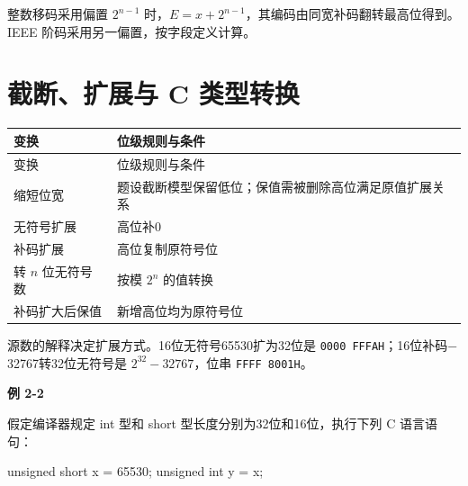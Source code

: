 整数移码采用偏置 \(2^{n-1}\) 时，\(E=x+2^{n-1}\)，其编码由同宽补码翻转最高位得到。IEEE 阶码采用另一偏置，按字段定义计算。

\section{截断、扩展与 C 类型转换}\label{CO02-conversion}

\par\smallskip
{\fontsize{9.3}{12}\selectfont\setlength{\tabcolsep}{2.5pt}\setlength{\LTleft}{0pt}\setlength{\LTright}{0pt}
\begin{longtable}{@{}>{\raggedright\arraybackslash}p{}>{\raggedright\arraybackslash}p{}@{}}
\toprule
变换 & 位级规则与条件 \\

\midrule\endfirsthead\toprule
变换 & 位级规则与条件 \\

\midrule\endhead\bottomrule\endfoot
缩短位宽 & 题设截断模型保留低位；保值需被删除高位满足原值扩展关系 \\

无符号扩展 & 高位补0 \\

补码扩展 & 高位复制原符号位 \\

转 \(n\) 位无符号数 & 按模 \(2^n\) 的值转换 \\

补码扩大后保值 & 新增高位均为原符号位 \\

\end{longtable}}
\par\smallskip

源数的解释决定扩展方式。16位无符号65530扩为32位是 \texttt{0000 FFFAH}；16位补码\ensuremath{-}32767转32位无符号是 \(2^{32}-32767\)，位串 \texttt{FFFF 8001H}。

\par\medskip{}\noindent\hypertarget{CO02-E02}{}\label{CO02-E02}\textbf{例 2-2}\par\nobreak\smallskip

假定编译器规定 int 型和 short 型长度分别为32位和16位，执行下列 C 语言语句：

\par\smallskip\noindent\begin{minipage}{\linewidth}
\begin{codeblock}[language={C}]
unsigned short x = 65530;
unsigned int y = x;
\end{codeblock}
\end{minipage}\par\smallskip

